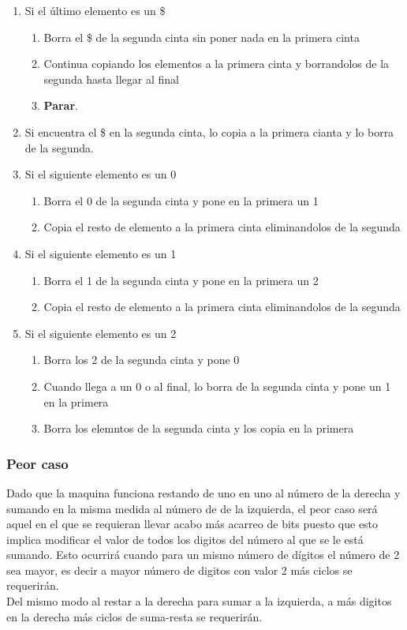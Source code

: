 \begin{itemize}
\begin{enumerate}
        \item Si el último elemento es un \$
        \begin{enumerate}
            \item Borra el \$ de la segunda cinta sin poner nada en la primera cinta
            \item Continua copiando los elementos a la primera cinta y borrandolos de la segunda hasta llegar al final
            \item \textbf{Parar}.
        \end{enumerate} 
        \item Si encuentra el \$ en la segunda cinta, lo copia a la primera cianta y lo borra de la segunda.
        \item Si el siguiente elemento es un 0
        \begin{enumerate}
            \item Borra el 0 de la segunda cinta y pone en la primera un 1
            \item Copia el resto de elemento a la primera cinta eliminandolos de la segunda
        \end{enumerate}
        \item Si el siguiente elemento es un 1
        \begin{enumerate}
            \item Borra el 1 de la segunda cinta y pone en la primera un 2
            \item Copia el resto de elemento a la primera cinta eliminandolos de la segunda
        \end{enumerate}
        \item Si el siguiente elemento es un 2
        \begin{enumerate}
            \item Borra los 2 de la segunda cinta y pone 0
            \item Cuando llega a un 0 o al final, lo borra de la segunda cinta y pone un 1 en la primera
            \item Borra los elemntos de la segunda cinta y los copia en la primera
        \end{enumerate}
    \end{enumerate}
\end{itemize}




\subsubsection*{Peor caso}
Dado que la maquina funciona restando de uno en uno al número de la derecha y sumando en la misma medida al número de de la izquierda, el peor caso será aquel en el que se requieran llevar acabo más acarreo de bits puesto que esto implica modificar el valor de todos los digitos del número al que se le está sumando. Esto ocurrirá cuando para un mismo número de dígitos el número de 2 sea mayor, es decir a mayor número de digitos con valor 2 más ciclos se requerirán.\\
Del mismo modo al restar a la derecha para sumar a la izquierda, a más digitos en la derecha más ciclos de suma-resta se requerirán.

